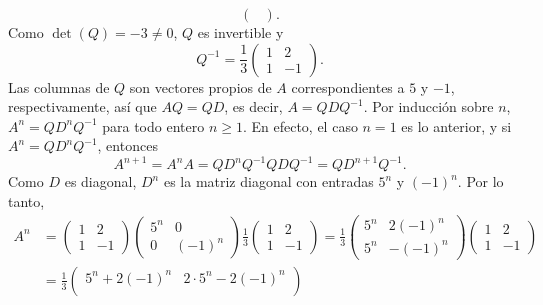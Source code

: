 \documentclass[12pt,a4paper]{article}
\begin{document}
\begin{solucion}
\begin{equation*}
\begin{pmatrix}
            \end{pmatrix}.
        \end{equation*}
        Como $\det(Q)=-3\neq0$, $Q$ es invertible y
        \begin{equation*}
            Q^{-1}=\frac{1}{3}
            \begin{pmatrix}
                1 & 2\\
                1 & -1
            \end{pmatrix}.
        \end{equation*}
        Las columnas de $Q$ son vectores propios de $A$ correspondientes a $5$ y $-1$, respectivamente, así que $AQ=QD$, es decir, $A=QDQ^{-1}$. Por inducción sobre $n$, $A^{n}=QD^{n}Q^{-1}$ para todo entero $n\geq1$. En efecto, el caso $n=1$ es lo anterior, y si $A^{n}=QD^{n}Q^{-1}$, entonces
        \begin{equation*}
            A^{n+1}=A^{n}A=QD^{n}Q^{-1}QDQ^{-1}=QD^{n+1}Q^{-1}.
        \end{equation*}
        Como $D$ es diagonal, $D^{n}$ es la matriz diagonal con entradas $5^{n}$ y $(-1)^{n}$. Por lo tanto,
        \begin{align*}
            A^{n}&=
            \begin{pmatrix}
                1 & 2\\
                1 & -1
            \end{pmatrix}
            \begin{pmatrix}
                5^{n} & 0\\
                0 & (-1)^{n}
            \end{pmatrix}
            \frac{1}{3}
            \begin{pmatrix}
                1 & 2\\
                1 & -1
            \end{pmatrix}
            =\frac{1}{3}
            \begin{pmatrix}
                5^{n} & 2(-1)^{n}\\
                5^{n} & -(-1)^{n}
            \end{pmatrix}
            \begin{pmatrix}
                1 & 2\\
                1 & -1
            \end{pmatrix}\\
            &=\frac{1}{3}
            \begin{pmatrix}
                5^{n}+2(-1)^{n} & 2\cdot5^{n}-2(-1)^{n}\\

\end{pmatrix}
\end{align*}
\end{solucion}
\end{document}
